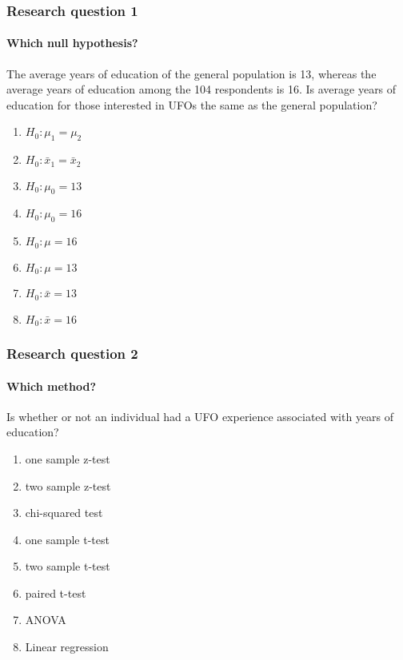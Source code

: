 \begin{frame}
\frametitle{Research question 1}
\framesubtitle{Which null hypothesis?}
\begin{clicker}{The average years of education of the general population is 13, whereas the average years of education among the 104 respondents is 16.  Is average years of education for those interested in UFOs the same as the general population?}
\begin{enumerate}
    \item
    $H_0: \mu_1=\mu_2$
    \item
    $H_0: \bar{x}_1=\bar{x}_2$
    \item
    $H_0: \mu_0=13$
    \item
    $H_0: \mu_0=16$
    \item
    $H_0: \mu=16$
    \item
    $H_0: \mu=13$
      \item
    $H_0: \bar{x}=13$
    \item
    $H_0: \bar{x}=16$
\end{enumerate}
\end{clicker}
\end{frame}

\begin{frame}
\frametitle{Research question 2}
\framesubtitle{Which method?}
\begin{clicker}{Is whether or not an individual had a UFO experience associated with years of education?}
\begin{enumerate}
    \item
    one sample z-test
    \item
    two sample z-test
    \item
    chi-squared test
    \item
    one sample t-test
    \item
    two sample t-test
    \item
    paired t-test
    \item
    ANOVA
    \item
    Linear regression
\end{enumerate}
\end{clicker}
\end{frame}

